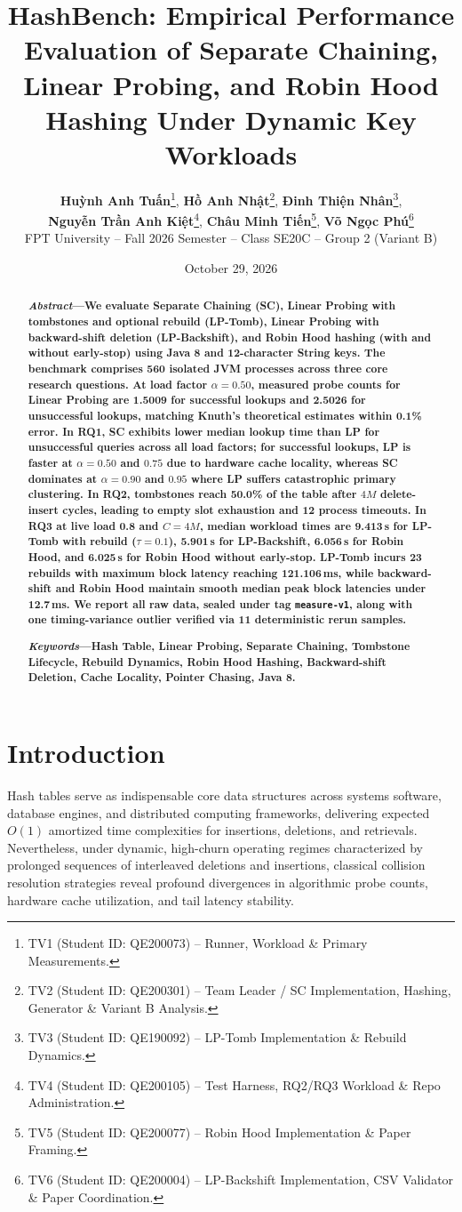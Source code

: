 \documentclass[twocolumn, 10pt, a4paper]{article}
\title{\Large \textbf{HashBench: Empirical Performance Evaluation of Separate Chaining, Linear Probing, and Robin Hood Hashing Under Dynamic Key Workloads}}
\author{
        \textbf{Huỳnh Anh Tuấn}\thanks{TV1 (Student ID: QE200073) -- Runner, Workload \& Primary Measurements.}, 
        \textbf{Hồ Anh Nhật}\thanks{TV2 (Student ID: QE200301) -- Team Leader / SC Implementation, Hashing, Generator \& Variant B Analysis.}, 
        \textbf{Đinh Thiện Nhân}\thanks{TV3 (Student ID: QE190092) -- LP-Tomb Implementation \& Rebuild Dynamics.}, \\
        \textbf{Nguyễn Trần Anh Kiệt}\thanks{TV4 (Student ID: QE200105) -- Test Harness, RQ2/RQ3 Workload \& Repo Administration.}, 
        \textbf{Châu Minh Tiến}\thanks{TV5 (Student ID: QE200077) -- Robin Hood Implementation \& Paper Framing.}, 
        \textbf{Võ Ngọc Phú}\thanks{TV6 (Student ID: QE200004) -- LP-Backshift Implementation, CSV Validator \& Paper Coordination.} \\
        \small FPT University -- Fall 2026 Semester -- Class SE20C -- Group 2 (Variant B)
    }
\date{\small October 29, 2026}
\begin{document}
\maketitle

\begin{abstract}
\textbf{\textit{Abstract}---We evaluate Separate Chaining (SC), Linear Probing with tombstones and optional rebuild (LP-Tomb), Linear Probing with backward-shift deletion (LP-Backshift), and Robin Hood hashing (with and without early-stop) using Java 8 and 12-character String keys. The benchmark comprises 560 isolated JVM processes across three core research questions. At load factor $\alpha=0.50$, measured probe counts for Linear Probing are 1.5009 for successful lookups and 2.5026 for unsuccessful lookups, matching Knuth's theoretical estimates within 0.1\% error. In RQ1, SC exhibits lower median lookup time than LP for unsuccessful queries across all load factors; for successful lookups, LP is faster at $\alpha=0.50$ and $0.75$ due to hardware cache locality, whereas SC dominates at $\alpha=0.90$ and $0.95$ where LP suffers catastrophic primary clustering. In RQ2, tombstones reach 50.0\% of the table after $4M$ delete-insert cycles, leading to empty slot exhaustion and 12 process timeouts. In RQ3 at live load 0.8 and $C=4M$, median workload times are 9.413\,s for LP-Tomb with rebuild ($\tau=0.1$), 5.901\,s for LP-Backshift, 6.056\,s for Robin Hood, and 6.025\,s for Robin Hood without early-stop. LP-Tomb incurs 23 rebuilds with maximum block latency reaching 121.106\,ms, while backward-shift and Robin Hood maintain smooth median peak block latencies under 12.7\,ms. We report all raw data, sealed under tag \texttt{measure-v1}, along with one timing-variance outlier verified via 11 deterministic rerun samples.}

\smallskip
\noindent\textbf{\textit{Keywords}---Hash Table, Linear Probing, Separate Chaining, Tombstone Lifecycle, Rebuild Dynamics, Robin Hood Hashing, Backward-shift Deletion, Cache Locality, Pointer Chasing, Java 8.}
\end{abstract}

\section{Introduction}
Hash tables serve as indispensable core data structures across systems software, database engines, and distributed computing frameworks, delivering expected $O(1)$ amortized time complexities for insertions, deletions, and retrievals. Nevertheless, under dynamic, high-churn operating regimes characterized by prolonged sequences of interleaved deletions and insertions, classical collision resolution strategies reveal profound divergences in algorithmic probe counts, hardware cache utilization, and tail latency stability.
\end{document}
